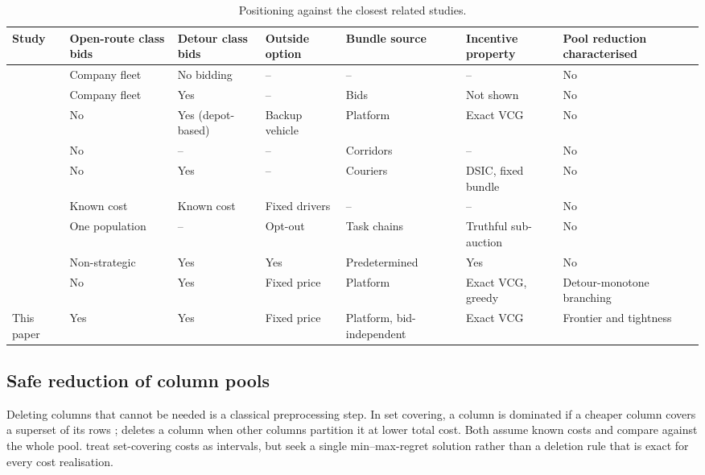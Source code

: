 \documentclass[review,12pt]{elsarticle}
\theoremstyle{definition}
\theoremstyle{remark}
\begin{document}
\begin{table}[t]
\centering
\caption{Positioning against the closest related studies.}
\label{tab:positioning}
\footnotesize
\setlength{\tabcolsep}{3pt}
\begin{tabular}{p{2.6cm}p{1.7cm}p{1.9cm}p{1.8cm}p{2.1cm}p{1.9cm}p{1.8cm}}
\toprule
Study & Open-route class bids & Detour class bids & Outside option & Bundle source & Incentive property & Pool reduction characterised \\
\midrule
\citet{archetti2016vrpod} & Company fleet & No bidding & -- & -- & -- & No \\
\citet{triki2021combinatorial} & Company fleet & Yes & -- & Bids & Not shown & No \\
\citet{zou2022mechanisms} & No & Yes (depot-based) & Backup vehicle & Platform & Exact VCG & No \\
\citet{mancini2022bundle} & No & -- & -- & Corridors & -- & No \\
\citet{chen2023truthful} & No & Yes & -- & Couriers & DSIC, fixed bundle & No \\
\citet{luy2024workforce} & Known cost & Known cost & Fixed drivers & -- & -- & No \\
\citet{oyama2025market} & One population & -- & Opt-out & Task chains & Truthful sub-auction & No \\
\citet{xu2026incentive} & Non-strategic & Yes & Yes & Predetermined & Yes & No \\
\citet{li2026auction} & No & Yes & Fixed price & Platform & Exact VCG, greedy & Detour-monotone branching \\
This paper & Yes & Yes & Fixed price & Platform, bid-independent & Exact VCG & Frontier and tightness \\
\bottomrule
\end{tabular}
\end{table}

\subsection{Safe reduction of column pools}

Deleting columns that cannot be needed is a classical preprocessing step.
In set covering, a column is dominated if a cheaper column covers a
superset of its rows \citep{beasley1987algorithm}; \citet{muller1998solving}
deletes a column when other columns partition it at lower total cost. Both
assume known costs and compare against the whole pool.
\citet{pereira2013robust} treat set-covering costs as intervals, but seek a
single min--max-regret solution rather than a deletion rule that is exact
for every cost realisation.
\end{document}
